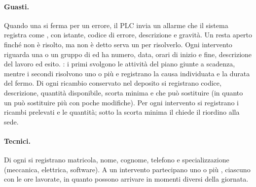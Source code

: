 \paragraph{Guasti.}
Quando una  si ferma per un errore, il PLC invia un allarme che il sistema registra come
, con istante, codice di errore, descrizione e gravità. Un  resta aperto finché non è
risolto, ma non è detto serva un  per risolverlo.
Ogni intervento riguarda una  o un gruppo di  ed ha numero, data, orari di inizio e
fine, descrizione del lavoro ed esito. : i primi svolgono le attività del piano giunte a scadenza, mentre i secondi risolvono uno o più  e registrano la causa individuata e la durata del fermo.
Di ogni ricambio conservato nel deposito si registrano codice, descrizione, quantità disponibile,
scorta minima e  che può sostituire (in quanto un  può sostituire più 
con poche modifiche). Per ogni intervento si registrano i ricambi prelevati e le quantità; sotto la
scorta minima il  chiede il riordino alla sede.

\paragraph{Tecnici.}
Di ogni  si registrano matricola, nome, cognome, telefono e specializzazione (meccanica,
elettrica, software). A un intervento partecipano uno o più , ciascuno con le ore lavorate,
in quanto possono arrivare in momenti diversi della giornata.
